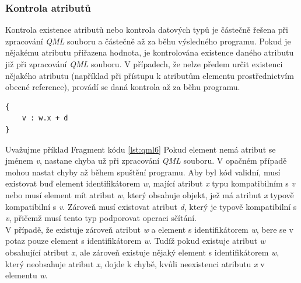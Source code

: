 \documentclass[11pt,twoside,a4paper]{book}
\begin{document}
\subsubsection{Kontrola atributů}
Kontrola existence atributů nebo kontrola datových typů je částečně řešena při zpracování \textit{QML} souboru a částečně až za běhu výsledného programu. Pokud je nějakému atributu přiřazena hodnota, je kontrolována existence daného atributu již při zpracování \textit{QML} souboru. V případech, že nelze předem určit existenci nějakého atributu (například při přístupu k atributům elementu prostřednictvím obecné reference), provádí se daná kontrola až za běhu programu.
\begin{lstlisting}[frame=single,caption=Ukázka použití komponenty z jiného souboru.,label=lst:qml6]
{
	v : w.x + d
}
\end{lstlisting}
Uvažujme příklad Fragment kódu \ref{lst:qml6} Pokud element nemá atribut se jménem \textit{v}, nastane chyba už při zpracování \textit{QML} souboru. V opačném případě mohou nastat chyby až během spuštění programu. Aby byl kód validní, musí existovat buď element identifikátorem \textit{w}, mající atribut \textit{x} typu kompatibilním s \textit{v} nebo musí element mít atribut \textit{w}, který obsahuje objekt, jež má atribut \textit{x} typově kompatibilní s \textit{v}. Zároveň musí existovat atribut \textit{d}, který je typově kompatibilní s \textit{v}, přičemž musí tento typ podporovat operaci sčítání.\\
V případě, že existuje zároveň atribut \textit{w} a element s identifikátorem \textit{w}, bere se v potaz pouze element s identifikátorem \textit{w}. Tudíž pokud existuje atribut \textit{w} obsahující atribut \textit{x}, ale zároveň existuje nějaký element s identifikátorem \textit{w}, který neobsahuje atribut \textit{x}, dojde k chybě, kvůli neexistenci atributu \textit{x} v elementu \textit{w}. 
\end{document}
